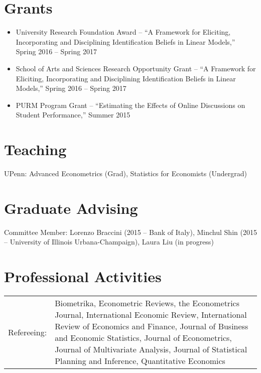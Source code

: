 \documentclass[line,overlapped]{myres}
\begin{document}
\begin{resume}
\section{\sc Grants}
\begin{itemize}
  \item University Research Foundation Award  -- ``A Framework for Eliciting, Incorporating and Disciplining Identification Beliefs in Linear Models,'' Spring 2016 -- Spring 2017
  \item School of Arts and Sciences Research Opportunity Grant -- ``A Framework for Eliciting, Incorporating and Disciplining Identification Beliefs in Linear Models,'' Spring 2016 -- Spring 2017   
  \item PURM Program Grant -- ``Estimating the Effects of Online Discussions on Student Performance,'' Summer 2015
\end{itemize}



\section{\sc Teaching }
\vspace{0.5em}
	UPenn: Advanced Econometrics (Grad), Statistics for Economists (Undergrad)
	


\section{\sc Graduate Advising}
\vspace{0.5em}
Committee Member: Lorenzo Braccini (2015 -- Bank of Italy), Minchul Shin (2015 -- University of Illinois Urbana-Champaign), Laura Liu (in progress)


\section{\sc Professional Activities}
\vspace{1em}

\begin{tabular}{p{2cm}p{12cm}}
Refereeing: & Biometrika, 
Econometric Reviews, 
the Econometrics Journal, 
International Economic Review,  
International Review of Economics and Finance,
Journal of Business and Economic Statistics, 
Journal of Econometrics,
Journal of Multivariate Analysis,
Journal of Statistical Planning and Inference, 
Quantitative Economics

\end{tabular}



\end{resume}
\end{document}
